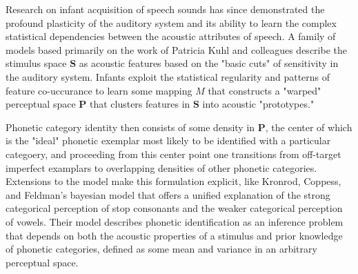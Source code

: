 Research on infant acquisition of speech sounds has since demonstrated the profound plasticity of the auditory system and its ability to learn the complex statistical dependencies between the acoustic attributes of speech\citep{kuhlNewViewLanguage2000}. A family of models based primarily on the work of Patricia Kuhl and colleagues describe the stimulus space $\mathbf{S}$ as acoustic features based on the "basic cuts" of sensitivity in the auditory system\citep{kuhlEarlyLanguageAcquisition2004}. Infants exploit the statistical regularity and patterns of feature co-uccurance to learn some mapping $M$ that constructs a "warped" perceptual space $\mathbf{P}$ that clusters features in $\mathbf{S}$ into acoustic "prototypes."\citep{kuhlNewViewLanguage2000} 

Phonetic category identity then consists of some density in $\mathbf{P}$, the center of which is the "ideal" phonetic exemplar most likely to be identified with a particular categoery, and proceeding from this center point one transitions from off-target imperfect examplars to overlapping densities of other phonetic categories. Extensions to the model make this formulation explicit, like Kronrod, Coppess, and Feldman's\citep{Kronrod2016a} bayesian model that offers a unified explanation of the strong categorical perception of stop consonants and the weaker categorical perception of vowels. Their model describes phonetic identification as an inference problem that depends on both the acoustic properties of a stimulus and prior knowledge of phonetic categories, defined as some mean and variance in an arbitrary perceptual space. 




